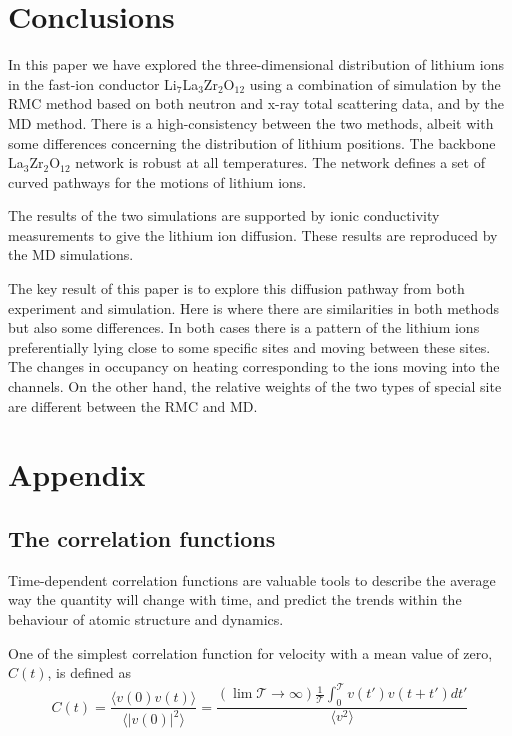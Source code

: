\documentclass[twoside,twocolumn,9pt]{article}
\begin{document}
\section{Conclusions}

In this paper we have explored the three-dimensional distribution of lithium ions in the fast-ion conductor Li$_7$La$_3$Zr$_2$O$_{12}$ using a combination of simulation by the RMC method based on both neutron and x-ray total scattering data, and by the MD method. There is a high-consistency between the two methods, albeit with some differences concerning the distribution of lithium positions. The backbone La$_3$Zr$_2$O$_{12}$ network is robust at all temperatures. The network defines a set of curved pathways for the motions of lithium ions.

The results of the two simulations are supported by ionic conductivity measurements to give the lithium ion diffusion. These results are reproduced by the MD simulations.

The key result of this paper is to explore this diffusion pathway from both experiment and simulation. Here is where there are similarities in both methods but also some differences. In both cases there is a pattern of the lithium ions preferentially lying close to some specific sites and moving between these sites. The changes in occupancy on heating corresponding to the ions moving into the channels. On the other hand, the relative weights of the two types of special site are different between the RMC and MD.

\section{Appendix}

\subsection{The correlation functions}

Time-dependent correlation functions are valuable tools to describe the average way the quantity will change with time,
and predict the trends within the behaviour of atomic structure and dynamics.


One of the simplest correlation function for velocity with a mean value of zero, $C(t)$, is defined as
 \begin{equation}
C(t)=\frac{\langle v(0)v(t)\rangle}{\langle | v(0)|^2 \rangle}
=\frac{(\lim \mathcal{T}\rightarrow \infty) \frac{1}{\mathcal{T}} \int^{\mathcal{T}}_{0} v(t')v(t+t')dt' }{\langle v^2 \rangle}
\end{equation}
\end{document}

